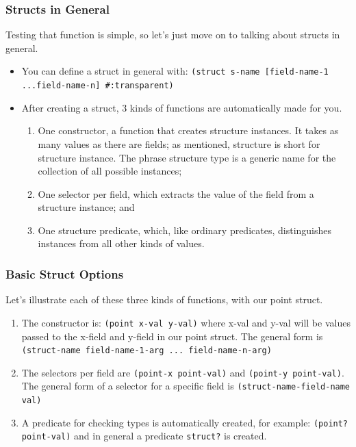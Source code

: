 \documentclass{beamer}
\begin{document}
\begin{frame}
  \frametitle{Structs in General}
  Testing that function is simple, so let's just move on to talking about
  structs in general.
  \begin{itemize}
  \item<2-> You can define a struct in general with:
    \texttt{(struct s-name [field-name-1 ...field-name-n] \#:transparent)}
  \item<3-> After creating a struct, 3 kinds of functions are automatically
    made for you.
    \begin{enumerate}
    \item<4-> One constructor, a function that creates structure instances. It takes as many values as there are fields; as mentioned, structure is short for structure instance. The phrase structure type is a generic name for the collection of all possible instances;
    \item<5-> One selector per field, which extracts the value of the field from a structure instance; and
    \item<6-> One structure predicate, which, like ordinary predicates, distinguishes instances from all other kinds of values.
    \end{enumerate}
  \end{itemize}
\end{frame}

\begin{frame}
  \frametitle{Basic Struct Options}
  Let's illustrate each of these three kinds of functions, with our point
  struct.
  \begin{enumerate}
  \item<2-> The constructor is: \texttt{(point x-val y-val)}
    where x-val and y-val will be values passed to the x-field and y-field in
    our point struct. The general form is \texttt{(struct-name field-name-1-arg ... field-name-n-arg)}
  \item<3-> The selectors per field are \texttt{(point-x point-val)} and \texttt{(point-y point-val)}. The general form
    of a selector for a specific field is \texttt{(struct-name-field-name val)}
  \item<4-> A predicate for checking types is automatically created, for example:
    \texttt{(point? point-val)} and in general a predicate
    \texttt{struct?} is created.
  \end{enumerate}
\end{frame}
\end{document}
